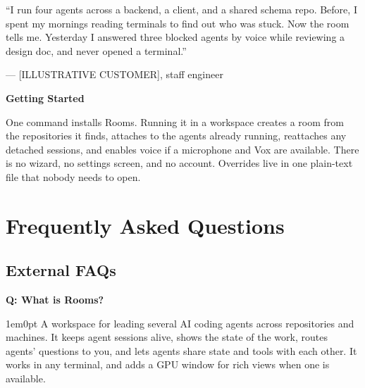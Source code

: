 \documentclass[11pt,letterpaper]{article}
\newcommand{\product}{Rooms}
\newcommand{\prsection}[1]{%
  \vspace{1em}%
  {\large\bfseries\color{SectionBlue}#1}%
  \vspace{0.3em}\par%
}
\newcounter{faqnum}
\newenvironment{faqpair}[1]{%
  \needspace{4\baselineskip}%
  \vspace{0.5em}%
  \refstepcounter{faqnum}%
  \noindent\textbf{\color{SectionBlue}Q\thefaqnum: #1}\par\nopagebreak[4]%
  \vspace{0.2em}%
  \begin{adjustwidth}{1em}{0pt}%
  \setlength{\parindent}{0pt}%
}{%
  \end{adjustwidth}%
  \vspace{0.5em}%
}
\begin{document}
\begin{customerquote}
``I run four agents across a backend, a client, and a shared schema repo. Before,
I spent my mornings reading terminals to find out who was stuck. Now the room
tells me. Yesterday I answered three blocked agents by voice while reviewing a
design doc, and never opened a terminal.''
\par\vspace{0.3em}\hfill--- [ILLUSTRATIVE CUSTOMER], staff engineer
\end{customerquote}

\prsection{Getting Started}

One command installs \product{}. Running it in a workspace creates a room
from the repositories it finds, attaches to the agents already running,
reattaches any detached sessions, and enables voice if a microphone and Vox are
available. There is no wizard, no settings screen, and no account. Overrides
live in one plain-text file that nobody needs to open.


\newpage
\section*{Frequently Asked Questions}

\subsection*{External FAQs}

\begin{faqpair}{What is \product{}?}\label{faq:what}
A workspace for leading several AI coding agents across repositories and
machines. It keeps agent sessions alive, shows the state of the work, routes
agents' questions to you, and lets agents share state and tools with each
other. It works in any terminal, and adds a GPU window for rich views when one
is available.
\end{faqpair}
\end{document}
